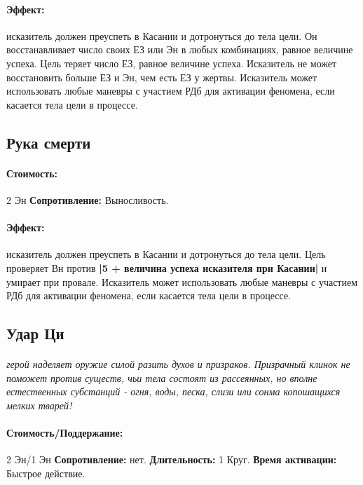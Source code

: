 \paragraph{Эффект: }исказитель должен преуспеть в Касании и дотронуться до тела цели. Он восстанавливает число своих ЕЗ или Эн в любых комбинациях, равное величине успеха. Цель теряет число ЕЗ, равное величине успеха. Исказитель не может восстановить больше ЕЗ и Эн, чем есть ЕЗ у жертвы. 
\newline Исказитель может использовать любые маневры с участием РДб для активации феномена, если касается тела цели в процессе.
\subsection{Рука смерти}
\paragraph{} 
\textit{
\tbd}
\paragraph{Стоимость: }2 Эн
\newline
\textbf{Сопротивление: }Выносливость.
\paragraph{Эффект: }исказитель должен преуспеть в Касании и дотронуться до тела цели. Цель проверяет Вн против 
\textbf{|5 + величина успеха исказителя при Касании|} и умирает при провале. Исказитель может использовать любые маневры с участием РДб для активации феномена, если касается тела цели в процессе.
\subsection{Удар Ци}
\paragraph{} 
\textit{герой наделяет оружие силой разить духов и призраков. Призрачный клинок не поможет против существ, чьи тела состоят из рассеянных, но вполне естественных субстанций - огня, воды, песка, слизи или сонма копошащихся мелких тварей!}
\paragraph{Стоимость/Поддержание: }2 Эн/1 Эн
\newline
\textbf{Сопротивление: }нет.
\newline 
\textbf{Длительность: }1 Круг.
\newline 
\textbf{Время активации: }Быстрое действие.
